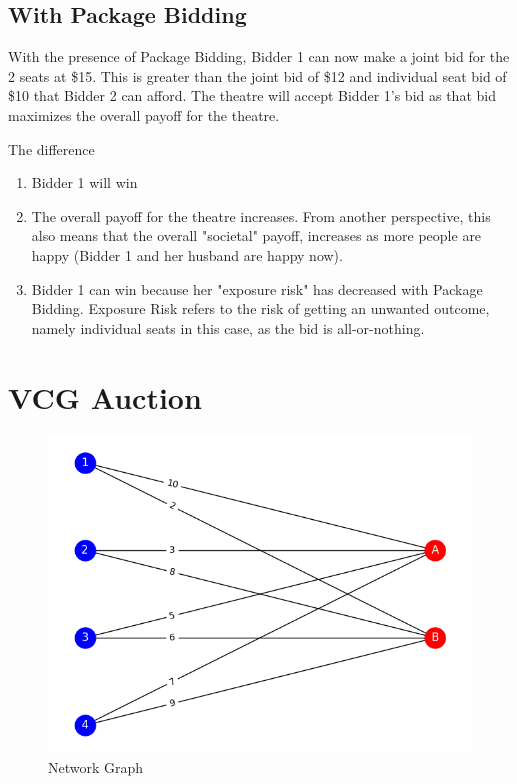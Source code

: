 \documentclass[]{article}
\begin{document}
\subsection{With Package Bidding}

With the presence of Package Bidding, Bidder 1 can now make a joint bid for the 2 seats at \$15. This is greater than the joint bid of \$12 and individual seat bid of \$10 that Bidder 2 can afford. The theatre will accept Bidder 1's bid as that bid maximizes the overall payoff for the theatre. 

The difference
\begin{enumerate}
	\item Bidder 1 will win
	\item The overall payoff for the theatre increases. From another perspective, this also means that the overall "societal" payoff, increases as more people are happy (Bidder 1 and her husband are happy now).
	\item Bidder 1 can win because her "exposure risk" has decreased with Package Bidding. Exposure Risk refers to the risk of getting an unwanted outcome, namely individual seats in this case, as the bid is all-or-nothing.
\end{enumerate}


\newpage
\section{VCG Auction}

\begin{figure}[H]
	\includegraphics[width=\linewidth]{Image-2.png}
	\caption{Network Graph} 
	\label{Q5.1 Network Graph}
\end{figure}
\end{document}
